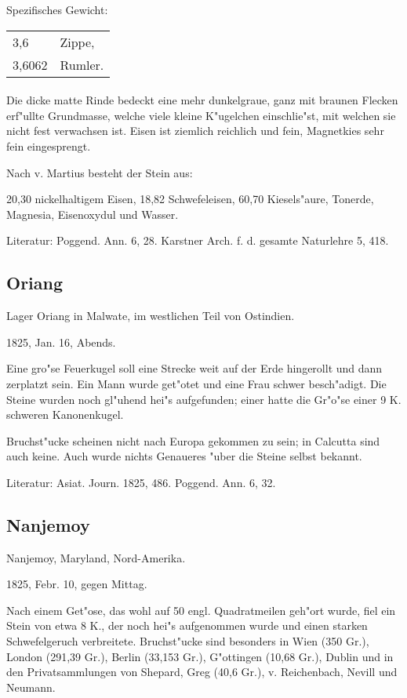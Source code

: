 \documentclass[a4paper, 11pt, oneside]{article}
\begin{document}
Spezifisches Gewicht:
\begin{table}[!ht]
    \centering
    \begin{tabular}{l l}
        3,6 & Zippe,\\
        3,6062 & Rumler.
    \end{tabular}
\end{table}
\paragraph{}
Die dicke matte Rinde bedeckt eine mehr dunkelgraue, ganz mit braunen Flecken erf"ullte Grundmasse, welche viele kleine K"ugelchen einschlie"st, mit welchen sie nicht fest verwachsen ist. Eisen ist ziemlich reichlich und fein, Magnetkies sehr fein eingesprengt.

Nach v. Martius besteht der Stein aus:

20,30 nickelhaltigem Eisen,  
18,82 Schwefeleisen,  
60,70 Kiesels"aure, Tonerde, Magnesia, Eisenoxydul und Wasser.

Literatur: Poggend. Ann. 6, 28. Karstner Arch. f. d. gesamte Naturlehre 5, 418.

\subsection{Oriang}

Lager Oriang in Malwate, im westlichen Teil von Ostindien.

1825, Jan. 16, Abends.

Eine gro"se Feuerkugel soll eine Strecke weit auf der Erde hingerollt und dann zerplatzt sein. Ein Mann wurde get"otet und eine Frau schwer besch"adigt. Die Steine wurden noch gl"uhend hei"s aufgefunden; einer hatte die Gr"o"se einer 9 K. schweren Kanonenkugel.

Bruchst"ucke scheinen nicht nach Europa gekommen zu sein; in Calcutta sind auch keine. Auch wurde nichts Genaueres "uber die Steine selbst bekannt.

Literatur: Asiat. Journ. 1825, 486. Poggend. Ann. 6, 32.

\subsection{Nanjemoy}

Nanjemoy, Maryland, Nord-Amerika.

1825, Febr. 10, gegen Mittag.

Nach einem Get"ose, das wohl auf 50 engl. Quadratmeilen geh"ort wurde, fiel ein Stein von etwa 8 K., der noch hei"s aufgenommen wurde und einen starken Schwefelgeruch verbreitete. Bruchst"ucke sind besonders in Wien (350 Gr.), London (291,39 Gr.), Berlin (33,153 Gr.), G"ottingen (10,68 Gr.), Dublin und in den Privatsammlungen von Shepard, Greg (40,6 Gr.), v. Reichenbach, Nevill und Neumann.
\end{document}
